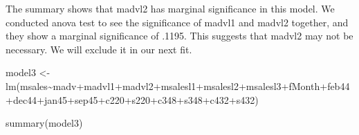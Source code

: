 \documentclass[
]{article}
\newenvironment{Shaded}{\begin{snugshade}}{\end{snugshade}}
\newcommand{\FunctionTok}[1]{\textcolor[rgb]{0.00,0.00,0.00}{#1}}
\newcommand{\NormalTok}[1]{#1}
\newcommand{\OtherTok}[1]{\textcolor[rgb]{0.56,0.35,0.01}{#1}}
\newcommand{\SpecialCharTok}[1]{\textcolor[rgb]{0.00,0.00,0.00}{#1}}
\begin{document}
The summary shows that madvl2 has marginal significance in this model.
We conducted anova test to see the significance of madvl1 and madvl2
together, and they show a marginal significance of .1195. This suggests
that madvl2 may not be necessary. We will exclude it in our next fit.

\begin{Shaded}
\begin{Highlighting}[]
\NormalTok{model3 }\OtherTok{\textless{}{-}} \FunctionTok{lm}\NormalTok{(msales}\SpecialCharTok{\textasciitilde{}}\NormalTok{madv}\SpecialCharTok{+}\NormalTok{madvl1}\SpecialCharTok{+}\NormalTok{madvl2}\SpecialCharTok{+}\NormalTok{msalesl1}\SpecialCharTok{+}\NormalTok{msalesl2}\SpecialCharTok{+}\NormalTok{msalesl3}\SpecialCharTok{+}\NormalTok{fMonth}\SpecialCharTok{+}\NormalTok{feb44}\SpecialCharTok{+}\NormalTok{dec44}\SpecialCharTok{+}\NormalTok{jan45}\SpecialCharTok{+}\NormalTok{sep45}\SpecialCharTok{+}\NormalTok{c220}\SpecialCharTok{+}\NormalTok{s220}\SpecialCharTok{+}\NormalTok{c348}\SpecialCharTok{+}\NormalTok{s348}\SpecialCharTok{+}\NormalTok{c432}\SpecialCharTok{+}\NormalTok{s432)}

\FunctionTok{summary}\NormalTok{(model3)}
\end{Highlighting}
\end{Shaded}
\end{document}
